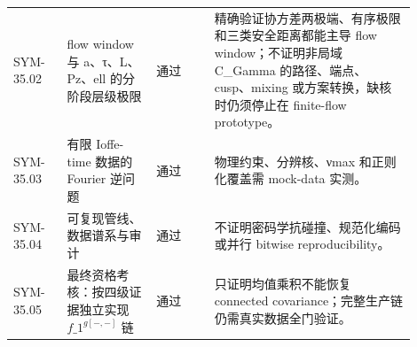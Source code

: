 \begin{longtable}{p{0.12\linewidth}p{0.20\linewidth}p{0.13\linewidth}p{0.45\linewidth}}
SYM-35.02 & flow window 与 a、τ、L、Pz、ell 的分阶段层级极限 & 通过 & 精确验证协方差两极端、有序极限和三类安全距离都能主导 flow window；不证明非局域 C\_Gamma 的路径、端点、cusp、mixing 或方案转换，缺核时仍须停止在 finite-flow prototype。\\
SYM-35.03 & 有限 Ioffe-time 数据的 Fourier 逆问题 & 通过 & 物理约束、分辨核、νmax 和正则化覆盖需 mock-data 实测。\\
SYM-35.04 & 可复现管线、数据谱系与审计 & 通过 & 不证明密码学抗碰撞、规范化编码或并行 bitwise reproducibility。\\
SYM-35.05 & 最终资格考核：按四级证据独立实现 $f\_1^{g[-,-]}$ 链 & 通过 & 只证明均值乘积不能恢复 connected covariance；完整生产链仍需真实数据全门验证。\\
\bottomrule
\end{longtable}
